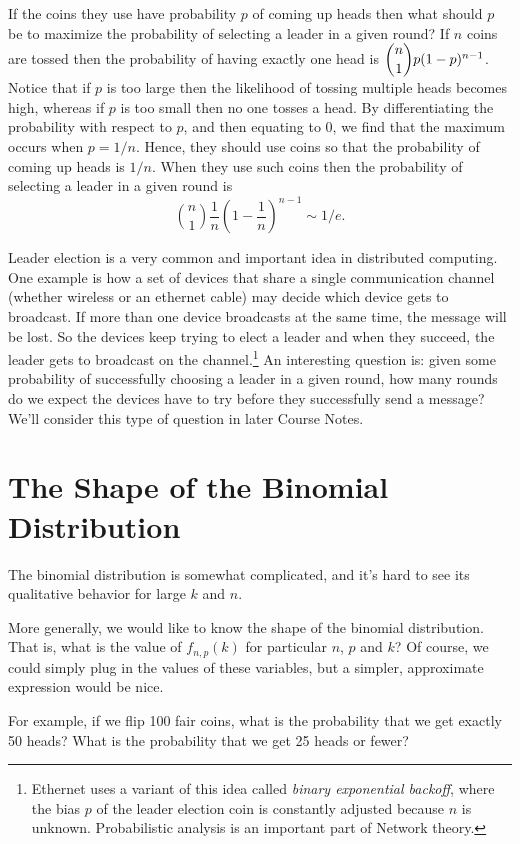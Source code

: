 \documentclass[11pt,twoside]{article}
\begin{document}
If the coins they use have probability $p$ of coming up heads then
what should $p$ be to maximize the probability of selecting a leader
in a given round? If $n$ coins are tossed then the probability of
having exactly one head is $\dbinom{n}{1} p(1-p)^{n-1}$. Notice that
if $p$ is too large then the likelihood of tossing multiple heads
becomes high, whereas if $p$ is too small then no one tosses a
head. By differentiating the probability with respect to $p$, and then equating
to $0$, we find that the maximum occurs when $p = 1/n$.  Hence, they
should use coins so that the probability of coming up heads is $1/n$.
When they use such coins then the probability of selecting a leader in
a given round is
\[
\binom{n}{1}\frac{1}{n}(1-\frac{1}{n})^{n-1} \sim 1/e.
\]

Leader election is a very common and important idea in distributed
computing. One example is how a set of devices that share a single
communication channel (whether wireless or an ethernet cable) may decide
which device gets to broadcast. If more than one device broadcasts at the
same time, the message will be lost. So the devices keep trying to elect a
leader and when they succeed, the leader gets to broadcast on the
channel.\footnote{Ethernet uses a variant of this idea called \emph{binary
exponential backoff}, where the bias $p$ of the leader election coin is
constantly adjusted because $n$ is unknown. Probabilistic analysis is an
important part of Network theory.} An interesting question is: given some
probability of successfully choosing a leader in a given round, how many
rounds do we expect the devices have to try before they successfully send
a message?  We'll consider this type of question in later Course Notes.


\section{The Shape of the Binomial Distribution}

The binomial distribution is somewhat complicated, and it's hard to see
its qualitative behavior for large $k$ and $n$.

\iffalse

More generally, we would like to know the shape of the binomial
distribution.  That is, what is the value of $f_{n, p}(k)$ for
particular $n$, $p$ and $k$?  Of course, we could simply plug in the
values of these variables, but a simpler, approximate expression would
be nice.

For example, if we flip 100 fair coins, what is the probability that
we get exactly 50 heads?  What is the probability that we get 25 heads
or fewer?
\end{document}

